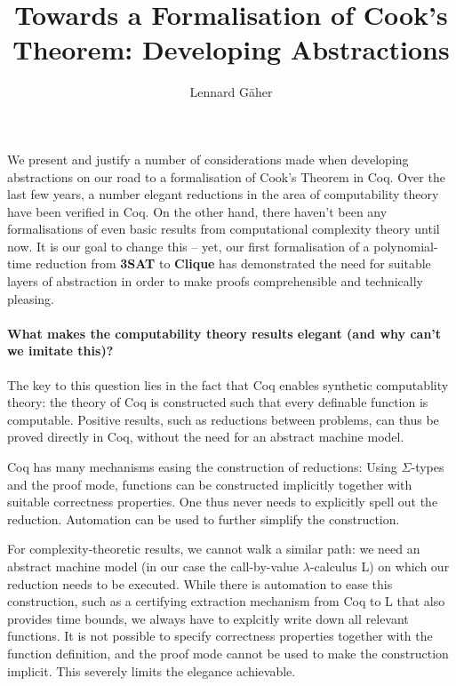 \documentclass[a4paper,UKenglish,cleveref, autoref]{lipics-v2019}
\title{Towards a Formalisation of Cook's Theorem: Developing Abstractions} %
\author{Lennard Gäher}{Saarland University, Germany}{s8legaeh@stud.uni-saarland.de}{}{}%
\begin{document}
\maketitle

\begin{abstract}
\end{abstract}

We present and justify a number of considerations made when developing abstractions on our road to a formalisation of Cook's Theorem in Coq. 
Over the last few years, a number elegant reductions in the area of computability theory have been verified in Coq. On the other hand, there haven't been any formalisations of even basic results from computational complexity theory until now. 
It is our goal to change this -- yet, our first formalisation of a polynomial-time reduction from \textbf{3SAT} to \textbf{Clique} has demonstrated the need for suitable layers of abstraction in order to make proofs comprehensible and technically pleasing.

\paragraph*{What makes the computability theory results elegant (and why can't we imitate this)?}
The key to this question lies in the fact that Coq enables synthetic computablity theory: the theory of Coq is constructed such that every definable function is computable. Positive results, such as reductions between problems, can thus be proved directly in Coq, without the need for an abstract machine model.

Coq has many mechanisms easing the construction of reductions: Using $\Sigma$-types and the proof mode, functions can be constructed implicitly together with suitable correctness properties. One thus never needs to explicitly spell out the reduction. Automation can be used to further simplify the construction. 

For complexity-theoretic results, we cannot walk a similar path: we need an abstract machine model (in our case the call-by-value $\lambda$-calculus L) on which our reduction needs to be executed. While there is automation to ease this construction, such as a certifying extraction mechanism from Coq to L that also provides time bounds, we always have to explcitly write down all relevant functions. It is not possible to specify correctness properties together with the function definition, and the proof mode cannot be used to make the construction implicit. This severely limits the elegance achievable.
\end{document}
